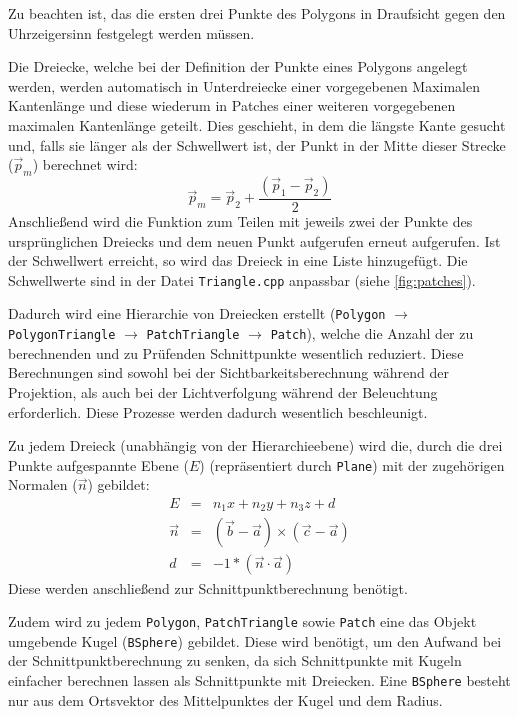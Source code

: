 \documentclass[final,a4paper,11pt,notitlepage,halfparskip]{scrreprt}
\begin{document}
Zu beachten ist, das die ersten drei Punkte des Polygons in Draufsicht gegen den
Uhrzeigersinn festgelegt werden müssen.

Die Dreiecke, welche bei der Definition der Punkte eines Polygons angelegt
werden, werden automatisch in Unterdreiecke einer vorgegebenen Maximalen
Kantenlänge und diese wiederum in Patches einer weiteren vorgegebenen maximalen
Kantenlänge geteilt. Dies geschieht, in dem die längste Kante gesucht und,
falls sie länger als der Schwellwert ist, der Punkt in der Mitte dieser Strecke
($\vec{p}_m$) berechnet wird:
$$\vec{p}_m = \vec{p}_2 + \frac{(\vec{p}_1 - \vec{p}_2)}{2}$$
Anschließend wird die Funktion zum Teilen mit jeweils zwei der Punkte des 
ursprünglichen Dreiecks und dem neuen Punkt aufgerufen erneut aufgerufen. 
Ist der Schwellwert erreicht, so wird das Dreieck in eine Liste hinzugefügt. 
Die Schwellwerte sind in der Datei \texttt{Triangle.cpp} anpassbar (siehe
\ref{fig:patches}).

Dadurch wird eine Hierarchie von Dreiecken erstellt (\texttt{Polygon} 
$\rightarrow$ \texttt{PolygonTriangle} $\rightarrow$ \texttt{PatchTriangle} 
$\rightarrow$ \texttt{Patch}), welche die Anzahl der zu berechnenden und zu
Prüfenden Schnittpunkte wesentlich reduziert. Diese Berechnungen sind sowohl bei
der Sichtbarkeitsberechnung während der Projektion, als auch bei der
Lichtverfolgung während der Beleuchtung erforderlich. Diese Prozesse werden
dadurch wesentlich beschleunigt.

Zu jedem Dreieck (unabhängig von der Hierarchieebene) wird die, durch die drei
Punkte aufgespannte Ebene ($E$) (repräsentiert durch \texttt{Plane})  
mit der zugehörigen Normalen ($\vec{n}$) gebildet:
\begin{eqnarray*}
    E &=& n_1x + n_2y + n_3z + d\\
    \vec{n} &=& (\vec{b} - \vec{a}) \times (\vec{c} - \vec{a})\\
    d &=& -1 * (\vec{n} \cdot \vec{a})
\end{eqnarray*}
Diese werden anschließend zur Schnittpunktberechnung benötigt.

Zudem wird zu jedem \texttt{Polygon}, \texttt{PatchTriangle} sowie
\texttt{Patch} eine das Objekt umgebende Kugel (\texttt{BSphere}) gebildet. Diese wird
benötigt, um den Aufwand bei der Schnittpunktberechnung zu senken, da sich
Schnittpunkte mit Kugeln einfacher berechnen lassen als Schnittpunkte mit
Dreiecken. Eine \texttt{BSphere} besteht nur aus dem Ortsvektor des
Mittelpunktes der Kugel und dem Radius.
\end{document}
